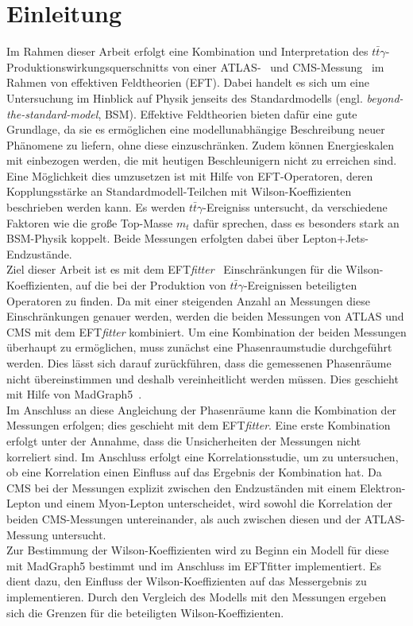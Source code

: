 \chapter{Einleitung}
Im Rahmen dieser Arbeit erfolgt eine Kombination und Interpretation des $t\bar{t}\gamma$-Produktionswirkungsquerschnitts von einer ATLAS-~\cite{Aaboud:2017era} und CMS-Messung~\cite{Sirunyan:2017iyh} im Rahmen von effektiven Feldtheorien (EFT). Dabei handelt es sich um eine Untersuchung im Hinblick auf Physik jenseits des Standardmodells (engl. \textit{beyond-the-standard-model}, BSM). Effektive Feldtheorien bieten dafür eine gute Grundlage, da sie es ermöglichen eine modellunabhängige Beschreibung neuer Phänomene zu liefern, ohne diese einzuschränken. Zudem können Energieskalen mit einbezogen werden, die mit heutigen Beschleunigern nicht zu erreichen sind. Eine Möglichkeit dies umzusetzen ist mit Hilfe von EFT-Operatoren, deren Kopplungsstärke an Standardmodell-Teilchen mit Wilson-Koeffizienten beschrieben werden kann. Es werden $t\bar{t}\gamma$-Ereigniss untersucht, da verschiedene Faktoren wie die große Top-Masse $m_t$ dafür sprechen, dass es besonders stark an BSM-Physik koppelt. Beide Messungen erfolgten dabei über Lepton+Jets-Endzustände.\\
Ziel dieser Arbeit ist es mit dem EFT\textit{fitter}~\cite{Castro:2016jjv} Einschränkungen für die Wilson-Koeffizienten, auf die bei der Produktion von $t\bar{t}\gamma$-Ereignissen beteiligten Operatoren zu finden. Da mit einer steigenden Anzahl an Messungen diese Einschränkungen genauer werden, werden die beiden Messungen von ATLAS und CMS mit dem EFT\textit{fitter} kombiniert.
Um eine Kombination der beiden Messungen überhaupt zu ermöglichen, muss zunächst eine Phasenraumstudie durchgeführt werden. Dies lässt sich darauf zurückführen, dass die gemessenen Phasenräume nicht übereinstimmen und deshalb vereinheitlicht werden müssen. Dies geschieht mit Hilfe von MadGraph5~\cite{Alwall:2014hca}.\\
Im Anschluss an diese Angleichung der Phasenräume kann die Kombination der Messungen erfolgen; dies geschieht mit dem EFT\textit{fitter}. Eine erste Kombination erfolgt unter der Annahme, dass die Unsicherheiten der Messungen nicht korreliert sind. Im Anschluss erfolgt eine Korrelationsstudie, um zu untersuchen, ob eine Korrelation einen Einfluss auf das Ergebnis der Kombination hat. Da CMS bei der Messungen explizit zwischen den Endzuständen mit einem Elektron-Lepton und einem Myon-Lepton unterscheidet, wird sowohl die Korrelation der beiden CMS-Messungen untereinander, als auch zwischen diesen und der ATLAS-Messung untersucht.\\
Zur Bestimmung der Wilson-Koeffizienten wird zu Beginn ein Modell für diese mit MadGraph5 bestimmt und im Anschluss im EFTfitter implementiert. Es dient dazu, den Einfluss der Wilson-Koeffizienten auf das Messergebnis zu implementieren. Durch den Vergleich des Modells mit den Messungen ergeben sich die Grenzen für die beteiligten Wilson-Koeffizienten.
